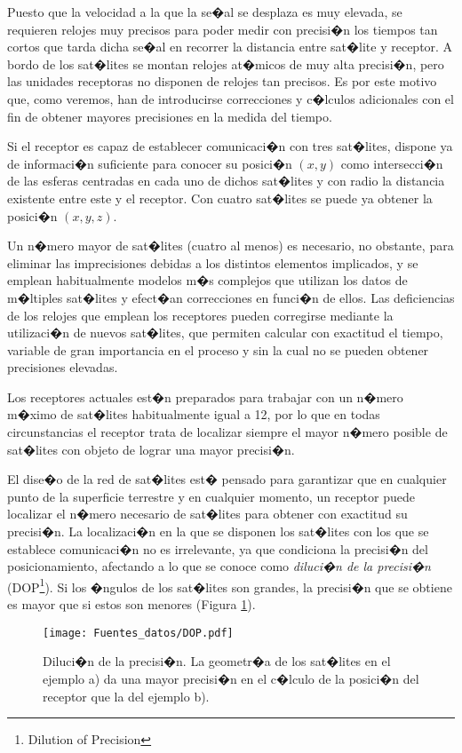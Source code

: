 Puesto que la velocidad a la que la se�al se desplaza es muy elevada, se requieren relojes muy precisos para poder medir con precisi�n los tiempos tan cortos que tarda dicha se�al en recorrer la distancia entre sat�lite y receptor. A bordo de los sat�lites se montan relojes at�micos de muy alta precisi�n, pero las unidades receptoras no disponen de relojes tan precisos. Es por este motivo que, como veremos, han de introducirse correcciones y c�lculos adicionales con el fin de obtener mayores precisiones en la medida del tiempo.

Si el receptor es capaz de establecer comunicaci�n con tres sat�lites, dispone ya de informaci�n suficiente para conocer su posici�n $(x,y)$ como intersecci�n de las esferas centradas en cada uno de dichos sat�lites y con radio la distancia existente entre este y el receptor. Con cuatro sat�lites se puede ya obtener la posici�n $(x,y,z)$.

Un n�mero mayor de sat�lites (cuatro al menos) es necesario, no obstante, para eliminar las imprecisiones debidas a los distintos elementos implicados, y se emplean habitualmente modelos m�s complejos que utilizan los datos de m�ltiples sat�lites y efect�an correcciones en funci�n de ellos. Las deficiencias de los relojes que emplean los receptores pueden corregirse mediante la utilizaci�n de nuevos sat�lites, que permiten calcular con exactitud el tiempo, variable de gran importancia en el proceso y sin la cual no se pueden obtener precisiones elevadas.

Los receptores actuales est�n preparados para trabajar con un n�mero m�ximo de sat�lites habitualmente igual a 12, por lo que en todas circunstancias el receptor trata de localizar siempre el mayor n�mero posible de sat�lites con objeto de lograr una mayor precisi�n.

El dise�o de la red de sat�lites est� pensado para garantizar que en cualquier punto de la superficie terrestre y en cualquier momento, un receptor puede localizar el n�mero necesario de sat�lites para obtener con exactitud su precisi�n. La localizaci�n en la que se disponen los sat�lites con los que se establece comunicaci�n no es irrelevante, ya que condiciona la precisi�n del posicionamiento, afectando a lo que se conoce como \emph{diluci�n de la precisi�n} (DOP\footnote{Dilution of Precision}). Si los �ngulos de los sat�lites son grandes, la precisi�n que se obtiene es mayor que si estos son menores (Figura \ref{Fig:DOP}).

\begin{figure}
\centering
\texttt{[image: Fuentes\_datos/DOP.pdf]}
\caption{\small Diluci�n de la precisi�n. La geometr�a de los sat�lites en el ejemplo a) da una mayor precisi�n en el c�lculo de la posici�n del receptor que la del ejemplo b).}
\label{Fig:DOP} 
\end{figure}

